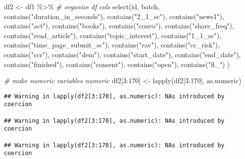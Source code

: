 \documentclass[
]{article}
\newenvironment{Shaded}{\begin{snugshade}}{\end{snugshade}}
\newcommand{\CommentTok}[1]{\textcolor[rgb]{0.56,0.35,0.01}{\textit{#1}}}
\newcommand{\DecValTok}[1]{\textcolor[rgb]{0.00,0.00,0.81}{#1}}
\newcommand{\FunctionTok}[1]{\textcolor[rgb]{0.00,0.00,0.00}{#1}}
\newcommand{\NormalTok}[1]{#1}
\newcommand{\OtherTok}[1]{\textcolor[rgb]{0.56,0.35,0.01}{#1}}
\newcommand{\SpecialCharTok}[1]{\textcolor[rgb]{0.00,0.00,0.00}{#1}}
\newcommand{\StringTok}[1]{\textcolor[rgb]{0.31,0.60,0.02}{#1}}
\begin{document}
\begin{Shaded}
\begin{Highlighting}[]
\NormalTok{df2 }\OtherTok{\textless{}{-}}\NormalTok{ df1 }\SpecialCharTok{\%\textgreater{}\%} \CommentTok{\# organize df cols}
  \FunctionTok{select}\NormalTok{(id, batch, }\FunctionTok{contains}\NormalTok{(}\StringTok{"duration\_in\_seconds"}\NormalTok{), }\FunctionTok{contains}\NormalTok{(}\StringTok{"2\_1\_sc"}\NormalTok{), }
         \FunctionTok{contains}\NormalTok{(}\StringTok{"news1"}\NormalTok{), }\FunctionTok{contains}\NormalTok{(}\StringTok{"act"}\NormalTok{), }\FunctionTok{contains}\NormalTok{(}\StringTok{"books"}\NormalTok{), }\FunctionTok{contains}\NormalTok{(}\StringTok{"convo"}\NormalTok{),}
         \FunctionTok{contains}\NormalTok{(}\StringTok{"share\_freq"}\NormalTok{), }\FunctionTok{contains}\NormalTok{(}\StringTok{"read\_article"}\NormalTok{), }\FunctionTok{contains}\NormalTok{(}\StringTok{"topic\_interest"}\NormalTok{), }
         \FunctionTok{contains}\NormalTok{(}\StringTok{"1\_1\_sc"}\NormalTok{), }\FunctionTok{contains}\NormalTok{(}\StringTok{"time\_page\_submit\_sc"}\NormalTok{), }
         \FunctionTok{contains}\NormalTok{(}\StringTok{"rav"}\NormalTok{), }\FunctionTok{contains}\NormalTok{(}\StringTok{"cc\_risk"}\NormalTok{), }\FunctionTok{contains}\NormalTok{(}\StringTok{"ccr"}\NormalTok{),}
         \FunctionTok{contains}\NormalTok{(}\StringTok{"dem"}\NormalTok{), }\FunctionTok{contains}\NormalTok{(}\StringTok{"start\_date"}\NormalTok{), }\FunctionTok{contains}\NormalTok{(}\StringTok{"end\_date"}\NormalTok{), }
         \FunctionTok{contains}\NormalTok{(}\StringTok{"finished"}\NormalTok{), }\FunctionTok{contains}\NormalTok{(}\StringTok{"consent"}\NormalTok{), }\FunctionTok{contains}\NormalTok{(}\StringTok{"open"}\NormalTok{), }\FunctionTok{contains}\NormalTok{(}\StringTok{"fl\_"}\NormalTok{)}
\NormalTok{         )}
\end{Highlighting}
\end{Shaded}

\begin{Shaded}
\begin{Highlighting}[]
\CommentTok{\# make numeric variables numeric}
\NormalTok{df2[}\DecValTok{3}\SpecialCharTok{:}\DecValTok{170}\NormalTok{] }\OtherTok{\textless{}{-}} \FunctionTok{lapply}\NormalTok{(df2[}\DecValTok{3}\SpecialCharTok{:}\DecValTok{170}\NormalTok{], as.numeric)}
\end{Highlighting}
\end{Shaded}

\begin{verbatim}
## Warning in lapply(df2[3:170], as.numeric): NAs introduced by coercion

## Warning in lapply(df2[3:170], as.numeric): NAs introduced by coercion

## Warning in lapply(df2[3:170], as.numeric): NAs introduced by coercion
\end{verbatim}
\end{document}
